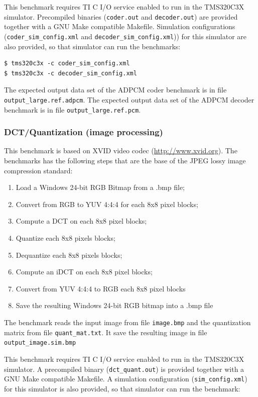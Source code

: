 This benchmark requires TI C I/O service enabled to run in the TMS320C3X simulator.
Precompiled binaries (\texttt{coder.out} and \texttt{decoder.out}) are provided together with a GNU Make compatible Makefile.
Simulation configurations (\texttt{coder\_sim\_config.xml} and \texttt{decoder\_sim\_config.xml})) for this simulator are also provided, so that simulator can run the benchmarks:

\begin{verbatim}
$ tms320c3x -c coder_sim_config.xml
$ tms320c3x -c decoder_sim_config.xml
\end{verbatim}

The expected output data set of the ADPCM coder benchmark is in file \texttt{output\_large.ref.adpcm}.
The expected output data set of the ADPCM decoder benchmark is in file \texttt{output\_large.ref.pcm}.

\subsubsection{DCT/Quantization (image processing)}

This benchmark is based on XVID video codec (\url{http://www.xvid.org}).
The benchmarks has the following steps that are the base of the JPEG lossy image compression standard:
\begin{enumerate}
\item Load a Windows 24-bit RGB Bitmap from a .bmp file;
\item Convert from RGB to YUV 4:4:4 for each 8x8 pixel blocks;
\item Compute a DCT on each 8x8 pixel blocks;
\item Quantize each 8x8 pixels blocks;
\item Dequantize each 8x8 pixels blocks;
\item Compute an iDCT on each 8x8 pixel blocks;
\item Convert from YUV 4:4:4 to RGB each 8x8 pixel blocks
\item Save the resulting Windows 24-bit RGB bitmap into a .bmp file
\end{enumerate}

The benchmark reads the input image from file \texttt{image.bmp} and the quantization matrix from file \texttt{quant\_mat.txt}.
It save the resulting image in file \texttt{output\_image.sim.bmp}

This benchmark requires TI C I/O service enabled to run in the TMS320C3X simulator.
A precompiled binary (\texttt{dct\_quant.out}) is provided together with a GNU Make compatible Makefile.
A simulation configuration (\texttt{sim\_config.xml}) for this simulator is also provided, so that simulator can run the benchmark:

